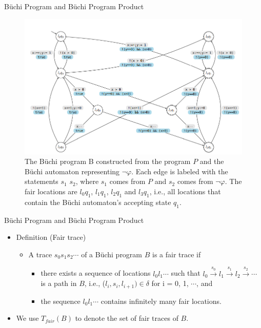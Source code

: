 \documentclass[12pt]{beamer}
\begin{document}
\captionsetup[figure]{font=scriptsize ,labelfont=scriptsize}
\begin{frame}{B\"uchi Program and B\"uchi Program Product}
    \begin{figure}
        \centering
        \includegraphics[scale=0.35]{Buchiprogram.png}
        \caption{The B\"uchi program B constructed from the program $P$ and the B\"uchi automaton representing $\neg\varphi$. Each edge is labeled with the statements $s_{1}$ $s_{2}$, where $s_{1}$ comes from $P$ and $s_{2}$ comes from $\neg\varphi$. The fair locations are $l_{0}q_{1}$, $l_{1}q_{1}$, $l_{2}q_{1}$ and $l_{3}q_{1}$, i.e., all locations that contain the B\"uchi automaton’s accepting state $q_{1}$.}
    \end{figure}    
\end{frame}


\begin{frame}{B\"uchi Program and B\"uchi Program Product}
  	\begin{itemize}
		\item Definition (Fair trace)
		\begin{itemize}
			\item A trace $s_{0}s_{1}s_{2}\cdots$ of a B\"uchi program $B$ is a fair trace if
			\begin{itemize}
				\item there exists a sequence of locations $l_{0}l_{1}\cdots$ such that $l_{0} \xrightarrow{s_{0}} l_{1} \xrightarrow{s_{1}} l_{2} \xrightarrow{s_{2}} \cdots$ is a path in $B$, i.e., ($l_{i},s_{i}, l_{i+1}) \in \delta$ for i = 0, 1, $\cdots$, and
				\item the sequence $l_{0}l_{1}\cdots$ contains infinitely many fair locations.
			\end{itemize}
		\end{itemize}
		\item We use $T_{fair}(B)$ to denote the set of fair traces of $B$.
  	\end{itemize}
\end{frame}
\end{document}
